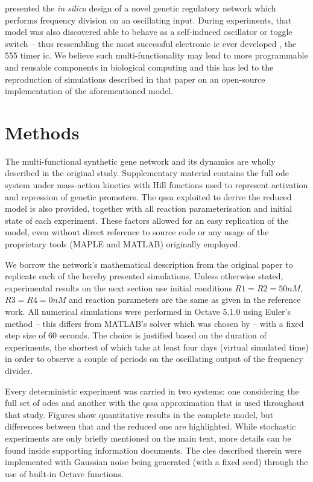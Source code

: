   \citet{multif} presented the \textit{in silico} design of a novel genetic regulatory network which performs frequency division on an oscillating input.
  During experiments, that model was also discovered able to behave as a self-induced oscillator or toggle switch -- thus ressembling the most successful electronic \ac{ic} ever developed \cite{ic555}, the 555 timer \acs{ic}.
  We believe such multi-functionality may lead to more programmable and reusable components in biological computing and this has led to the reproduction of simulations described in that paper on an open-source implementation of the aforementioned model.


\section{Methods}

  The multi-functional synthetic gene network and its dynamics are wholly described in the original study.
  Supplementary material contains the full \ac{ode} system under mass-action kinetics with Hill functions used to represent activation and repression of genetic promoters.
  The \ac{qssa} exploited to derive the reduced model is also provided, together with all reaction parameterisation and initial state of each experiment.
  These factors allowed for an easy replication of the model, even without direct reference to source code or any usage of the proprietary tools (MAPLE and MATLAB) originally employed.

  We borrow the network's mathematical description from the original paper to replicate each of the hereby presented simulations.
  Unless otherwise stated, experimental results on the next section use initial conditions $R1 = R2 = 50nM$, $R3 = R4 = 0nM$ and reaction parameters are the same as given in the reference work.
  All numerical simulations were performed in Octave 5.1.0 using Euler's method -- this differs from MATLAB's  solver which was chosen by \citet{multif} -- with a fixed step size of $60$ seconds.
  The choice is justified based on the duration of experiments, the shortest of which take at least four days (virtual simulated time) in order to observe a couple of periods on the oscillating output of the frequency divider.

  Every deterministic experiment was carried in two systems: one considering the full set of \ac{ode}s and another with the \ac{qssa} approximation that is used throughout that study.
  Figures show quantitative results in the complete model, but differences between that and the reduced one are highlighted.
  While stochastic experiments are only briefly mentioned on the main text, more details can be found inside supporting information documents.
  The \ac{cles} described therein were implemented with Gaussian noise being generated (with a fixed seed) through the use of built-in Octave functions.


